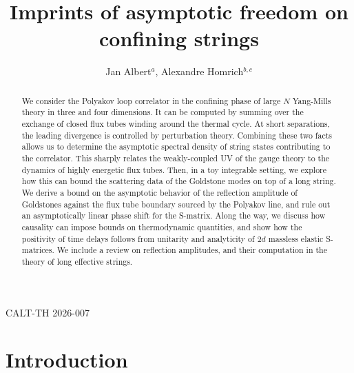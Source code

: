 \documentclass[
 reprint,
 amsmath,
 pre,
 amssymb,
 nofootinbib,
 aps,
 longbibliography,
]{revtex4-1}
\newcommand{\<}{{\langle}}
\renewcommand{\>}{{\rangle}}
\begin{document}
\setlength{\skip\footins}{0.5cm}
\addtolength{\textheight}{0.155in}
\addtolength{\topmargin}{-0.06in}


\title{
Imprints of asymptotic freedom on confining strings
}

\author{Jan Albert$^{a}$, Alexandre Homrich$^{b,c}$}

\begin{abstract}
We consider the Polyakov loop correlator in the confining phase of large $N$ Yang-Mills theory in three and four dimensions. It can be computed by summing over the exchange of closed flux tubes winding around the thermal cycle. At short separations, the leading divergence is controlled by perturbation theory. Combining these two facts allows us to determine the asymptotic spectral density of string states contributing to the correlator. This sharply relates the weakly-coupled UV of the gauge theory to the dynamics of highly energetic flux tubes.
Then, in a toy integrable setting, we explore how this
can bound the scattering data of the Goldstone modes on top of a long string. We derive a bound on the asymptotic behavior of the reflection amplitude  of Goldstones against the flux tube boundary sourced by the Polyakov line, and rule out an asymptotically linear phase shift for the S-matrix.
Along the way, we discuss how causality can impose bounds on thermodynamic quantities, and show how the positivity of time delays follows from unitarity and analyticity of $2d$ massless elastic S-matrices. We include a review on reflection amplitudes, and their computation in the theory of long effective strings.

\end{abstract}


\hfill CALT-TH 2026-007

\maketitle


\section{Introduction}
\end{document}
